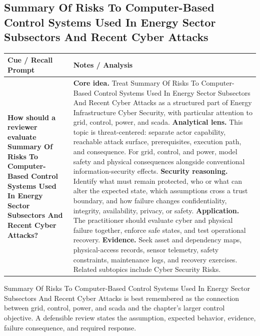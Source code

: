 \documentclass[11pt]{article}
\newcommand{\CornellHeader}{%
\rowcolor{Navy}\color{white}\bfseries Cue / Recall Prompt & \color{white}\bfseries Notes / Analysis\\\hline}
\newcommand{\CornellRow}[2]{%
\cellcolor{CueGray}\RaggedRight\textbf{#1} & \RaggedRight #2\\\hline}
\begin{document}
\subsection*{Summary Of Risks To Computer-Based Control Systems Used In Energy Sector Subsectors And Recent Cyber Attacks}
\begin{longtable}{>{\RaggedRight\arraybackslash}p{}|>{\RaggedRight\arraybackslash}p{}}
\CornellHeader
\CornellRow{How should a reviewer evaluate Summary Of Risks To Computer-Based Control Systems Used In Energy Sector Subsectors And Recent Cyber Attacks?}{\textbf{Core idea.} Treat Summary Of Risks To Computer-Based Control Systems Used In Energy Sector Subsectors And Recent Cyber Attacks as a structured part of Energy Infrastructure Cyber Security, with particular attention to grid, control, power, and scada. \textbf{Analytical lens.} This topic is threat-centered: separate actor capability, reachable attack surface, prerequisites, execution path, and consequence. For grid, control, and power, model safety and physical consequences alongside conventional information-security effects. \textbf{Security reasoning.} Identify what must remain protected, who or what can alter the expected state, which assumptions cross a trust boundary, and how failure changes confidentiality, integrity, availability, privacy, or safety. \textbf{Application.} The practitioner should evaluate cyber and physical failure together, enforce safe states, and test operational recovery. \textbf{Evidence.} Seek asset and dependency maps, physical-access records, sensor telemetry, safety constraints, maintenance logs, and recovery exercises. Related subtopics include Cyber Security Risks.}
\end{longtable}
\begin{topicsummary}
Summary Of Risks To Computer-Based Control Systems Used In Energy Sector Subsectors And Recent Cyber Attacks is best remembered as the connection between grid, control, power, and scada and the chapter's larger control objective. A defensible review states the assumption, expected behavior, evidence, failure consequence, and required response.
\end{topicsummary}
\end{document}
